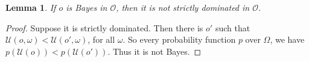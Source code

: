 \documentclass[a4paper]{article}
\newtheorem{theorem}{Theorem}
\newtheorem{lemma}[theorem]{Lemma}
\renewcommand\O{\mathcal{O}}
\newcommand\Uwald{\mathcal{U}} %
\newcommand{\todoold}[2][]{\todo[backgroundcolor=white,bordercolor=orange!10,linecolor=gray!10, #1,caption={},textcolor=gray]{Pre-rev: #2}}
\newenvironment{CCM rewritten}
{\begingroup\color{blue}} %
{\endgroup}              %
\begin{document}
	
	
	
	
	
	\begin{lemma}\label{thm:cct:Bayes implies admiss}
		If $o$ is Bayes in $\O$, then it is not strictly dominated in $\O$.
	\end{lemma}
	\begin{proof}
		Suppose it is strictly dominated. Then there is $o'$ such that $\Uwald(o,\omega)<\Uwald(o',\omega)$, for all $\omega$. So every probability function $p$ over $\Omega$, we have $p( \Uwald(o))<p(\Uwald(o'))$. %
		Thus it is not Bayes.
	\end{proof}
	
\end{document}
